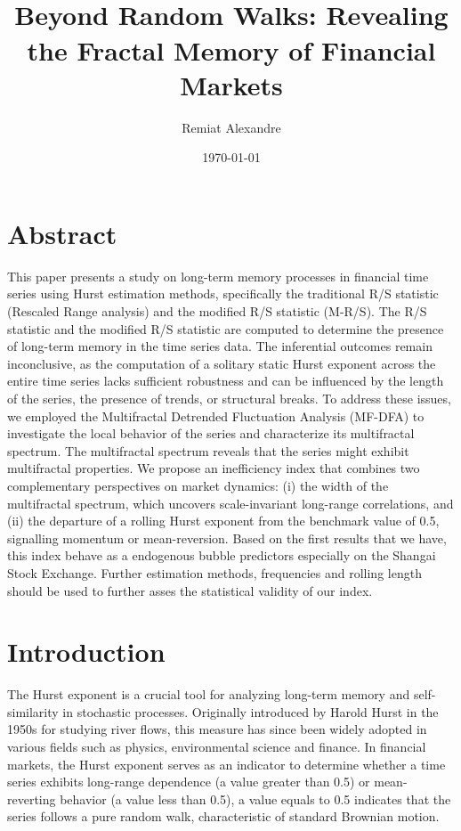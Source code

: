 \documentclass[11pt]{extarticle}
\title{
    \hspace*{-12cm}
    \vspace*{1cm}
    \protect\\
    \vspace*{1cm}
    \textbf{Beyond Random Walks: Revealing the Fractal Memory of Financial Markets}
}
\author{Remiat Alexandre}
\date{\today}
\begin{document}

\maketitle


\newpage


\section*{Abstract}

This paper presents a study on long-term memory processes in financial time series using Hurst estimation methods,
specifically the traditional R/S statistic (Rescaled Range analysis) and the modified R/S statistic (M-R/S).
The R/S statistic and the modified R/S statistic are computed to determine the presence of long-term memory in the time series data.
The inferential outcomes remain inconclusive, as the computation of a solitary static Hurst exponent
across the entire time series lacks sufficient robustness and can be influenced by the length of the series, the presence of trends, or structural breaks.
To address these issues, we employed the Multifractal Detrended Fluctuation Analysis (MF-DFA) to investigate the
local behavior of the series and characterize its multifractal spectrum. The multifractal spectrum reveals that the series
might exhibit multifractal properties. We propose an inefficiency index that combines two complementary perspectives on market dynamics:
(i) the width of the multifractal spectrum, which uncovers scale-invariant long-range correlations, and
(ii) the departure of a rolling Hurst exponent from the benchmark value of 0.5, signalling momentum or mean-reversion.
Based on the first results that we have, this index behave as a endogenous bubble predictors especially on the Shangai
Stock Exchange. Further estimation methods, frequencies and rolling length should be used to further asses the statistical
validity of our index.








\newpage

\section{Introduction}

The Hurst exponent is a crucial tool for analyzing long-term memory and self-similarity in stochastic processes.
Originally introduced by Harold Hurst in the 1950s for studying river flows, this measure has since been widely
adopted in various fields such as physics, environmental science and finance. In financial markets, the Hurst
exponent serves as an indicator to determine whether a time series exhibits long-range dependence (a value greater
than 0.5) or mean-reverting behavior (a value less than 0.5), a value equals to 0.5 indicates that the series
follows a pure random walk, characteristic of standard Brownian motion.
\end{document}
